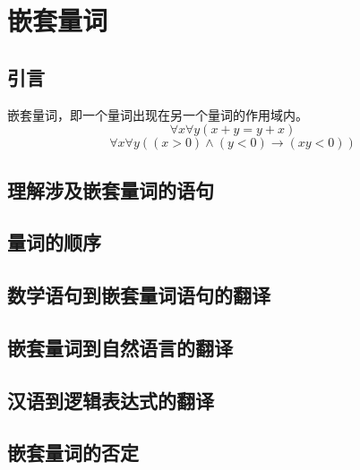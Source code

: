 \section{嵌套量词}
\subsection{引言}
嵌套量词，即一个量词出现在另一个量词的作用域内。
\[
\forall x \forall y (x+y=y+x)
\]
\[
\forall x\forall y((x>0)\land(y<0)\to(xy<0))
\]
\subsection{理解涉及嵌套量词的语句}
\subsection{量词的顺序}
\subsection{数学语句到嵌套量词语句的翻译}
\subsection{嵌套量词到自然语言的翻译}
\subsection{汉语到逻辑表达式的翻译}
\subsection{嵌套量词的否定}

